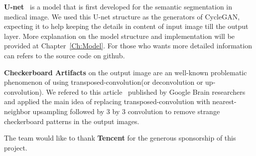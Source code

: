 \textbf{U-net}~\cite{unet} is a model that is first developed for the semantic segmentation in medical image. We used this U-net structure as the generators of CycleGAN, expecting it to help keeping the details in content of input image till the output layer. More explanation on the model structure and implementation will be provided at Chapter~\ref{Ch:Model}. For those who wants more detailed information can refers to the source code on github.

\textbf{Checkerboard Artifacts} on the output image are an well-known problematic phenomenon of using transposed-convolution(or deconvolution or up-convolution). We refered to this article~\cite{odena2016deconvolution} published by Google Brain researchers and applied the main idea of replacing transposed-convolution with nearest-neighbor upsampling followed by 3 by 3 convolution to remove strange checkerboard patterns in the output images.

The team would like to thank \textbf{Tencent} for the generous sponsorship of this project.

\endinput




